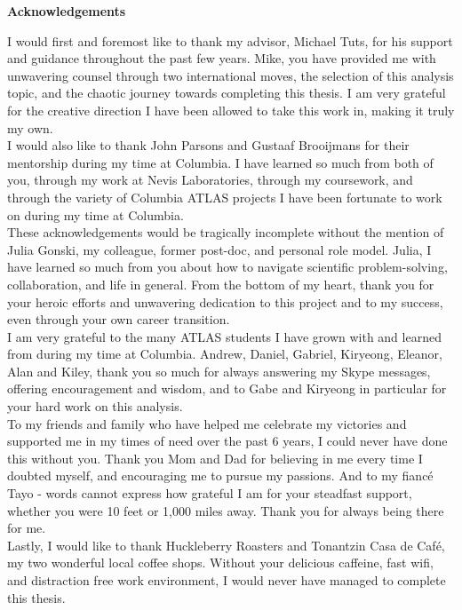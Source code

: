 
\clearpage
\begin{center}

\vspace*{5\baselineskip}
\textbf{\large Acknowledgements}
\end{center}

\begin{flushleft}
\hspace{10mm}I would first and foremost like to thank my advisor, Michael Tuts, for his support and guidance throughout the past few years. Mike, you have provided me with unwavering counsel through two international moves, the selection of this analysis topic, and the chaotic journey towards completing this thesis. I am very grateful for the creative direction I have been allowed to take this work in, making it truly my own.\\
\hspace{10mm}I would also like to thank John Parsons and Gustaaf Brooijmans for their mentorship during my time at Columbia. I have learned so much from both of you, through my work at Nevis Laboratories, through my coursework, and through the variety of Columbia ATLAS projects I have been fortunate to work on during my time at Columbia.\\
\hspace{10mm}These acknowledgements would be tragically incomplete without the mention of Julia Gonski, my colleague, former post-doc, and personal role model. Julia, I have learned so much from you about how to navigate scientific problem-solving, collaboration, and life in general. From the bottom of my heart, thank you for your heroic efforts and unwavering dedication to this project and to my success, even through your own career transition.\\
\hspace{10mm}I am very grateful to the many ATLAS students I have grown with and learned from during my time at Columbia. Andrew, Daniel, Gabriel, Kiryeong, Eleanor, Alan and Kiley, thank you so much for always answering my Skype messages, offering encouragement and wisdom, and to Gabe and Kiryeong in particular for your hard work on this analysis.\\
\hspace{10mm}To my friends and family who have helped me celebrate my victories and supported me in my times of need over the past 6 years, I could never have done this without you. Thank you Mom and Dad for believing in me every time I doubted myself, and encouraging me to pursue my passions. And to my fianc\'e Tayo - words cannot express how grateful I am for your steadfast support, whether you were 10 feet or 1,000 miles away. Thank you for always being there for me.\\
\hspace{10mm}Lastly, I would like to thank Huckleberry Roasters and Tonantzin Casa de Caf\'e, my two wonderful local coffee shops. Without your delicious caffeine, fast wifi, and distraction free work environment, I would never have managed to complete this thesis.
\end{flushleft}
\clearpage



